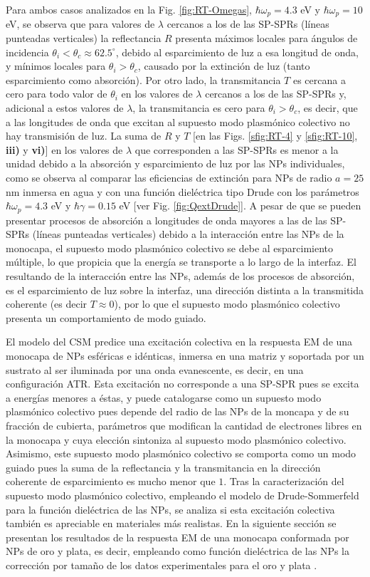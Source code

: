 Para ambos casos analizados en la Fig. \ref{fig:RT-Omegas}, $\hbar\omega_p = 4.3$ eV y $\hbar\omega_p = 10$ eV, se observa que para valores de $\lambda$ cercanos a los de las SP-SPRs (líneas punteadas verticales) la reflectancia $R$ presenta máximos locales para ángulos de incidencia $\theta_i<\theta_c \approx 62.5^\circ$, debido al esparcimiento de luz a esa longitud de onda, y mínimos locales para $\theta_i>\theta_c$, causado por la extinción de luz (tanto esparcimiento como absorción). Por otro lado, la transmitancia $T$ es cercana a cero para todo valor de $\theta_i$ en los valores de $\lambda$ cercanos a los de las SP-SPRs y, adicional a estos valores de $\lambda$, la transmitancia es cero para $\theta_i>\theta_c$, es decir, que a las longitudes de onda que excitan al supuesto modo plasmónico colectivo no hay transmisión de luz. La suma de $R$ y $T$ [en las Figs. \ref{sfig:RT-4} y \ref{sfig:RT-10}, \textbf{iii)} y \textbf{vi)}] en los valores de $\lambda$ que corresponden a las SP-SPRs es menor a la unidad debido a la absorción y esparcimiento de luz por las NPs individuales, como se observa al comparar las eficiencias de extinción para NPs de radio $a=25$ nm inmersa en agua y con una función dieléctrica tipo Drude con los parámetros $\hbar\omega_p=4.3$ eV  y $\hbar\gamma=0.15$ eV [ver  Fig. \ref{fig:QextDrude}]. A pesar de que se pueden presentar procesos de  absorción a longitudes de onda mayores a las de las SP-SPRs (líneas punteadas verticales) debido a la interacción entre las NPs de la monocapa, el supuesto modo plasmónico colectivo se debe al esparcimiento múltiple, lo que propicia que la energía se transporte a lo largo de la interfaz. El resultando de la interacción entre las NPs, además de los procesos de absorción, es el esparcimiento de luz sobre la interfaz, una dirección distinta a la transmitida coherente (es decir $T\approx 0$), por lo que el supuesto modo plasmónico colectivo presenta un comportamiento de modo guiado.

El modelo del CSM predice una excitación colectiva en la respuesta EM de una monocapa de NPs esféricas e idénticas, inmersa en una matriz y soportada por un sustrato al ser iluminada por una onda evanescente, es decir, en una configuración ATR. Esta excitación no corresponde a una SP-SPR pues se excita a energías menores a éstas, y puede catalogarse como un supuesto modo plasmónico colectivo pues depende del radio de las NPs de la moncapa y de su fracción de cubierta, parámetros que modifican la cantidad de electrones libres en la monocapa y cuya elección sintoniza al supuesto modo plasmónico colectivo. Asimismo, este supuesto modo plasmónico colectivo se comporta como un modo guiado pues la suma de la reflectancia y la transmitancia en la dirección coherente de esparcimiento es mucho menor que $1$. Tras la caracterización del supuesto modo plasmónico colectivo, empleando el modelo de Drude-Sommerfeld para la función dieléctrica de las NPs, se analiza si esta excitación colectiva también es apreciable en materiales más realistas. En la siguiente sección se presentan los resultados de la respuesta EM de una monocapa conformada por NPs de oro y plata, es decir, empleando como función dieléctrica de las NPs la corrección por tamaño de los datos experimentales para el oro y plata \cite{johnson1972constants}.

